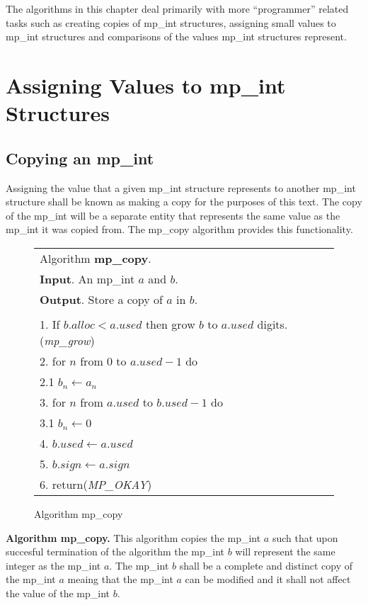 \documentclass[b5paper]{book}
\begin{document}
The algorithms in this chapter deal primarily with more ``programmer'' related tasks such as creating copies of
mp\_int structures, assigning small values to mp\_int structures and comparisons of the values mp\_int structures
represent.   

\section{Assigning Values to mp\_int Structures}
\subsection{Copying an mp\_int}
Assigning the value that a given mp\_int structure represents to another mp\_int structure shall be known as making
a copy for the purposes of this text.  The copy of the mp\_int will be a separate entity that represents the same
value as the mp\_int it was copied from.  The mp\_copy algorithm provides this functionality. 

\newpage\begin{figure}[here]
\begin{center}
\begin{tabular}{l}
\hline Algorithm \textbf{mp\_copy}. \\
\textbf{Input}.  An mp\_int $a$ and $b$. \\
\textbf{Output}.  Store a copy of $a$ in $b$. \\
\hline \\
1.  If $b.alloc < a.used$ then grow $b$ to $a.used$ digits.  (\textit{mp\_grow}) \\
2.  for $n$ from 0 to $a.used - 1$ do \\
\hspace{3mm}2.1  $b_{n} \leftarrow a_{n}$ \\
3.  for $n$ from $a.used$ to $b.used - 1$ do \\
\hspace{3mm}3.1  $b_{n} \leftarrow 0$ \\
4.  $b.used \leftarrow a.used$ \\
5.  $b.sign \leftarrow a.sign$ \\
6.  return(\textit{MP\_OKAY}) \\
\hline
\end{tabular}
\end{center}
\caption{Algorithm mp\_copy}
\end{figure}

\textbf{Algorithm mp\_copy.}
This algorithm copies the mp\_int $a$ such that upon succesful termination of the algorithm the mp\_int $b$ will
represent the same integer as the mp\_int $a$.  The mp\_int $b$ shall be a complete and distinct copy of the 
mp\_int $a$ meaing that the mp\_int $a$ can be modified and it shall not affect the value of the mp\_int $b$.
\end{document}
